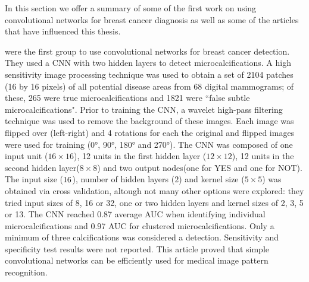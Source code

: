 In this section we offer a summary of some of the first work on using convolutional networks for breast cancer diagnosis as well as some of the articles that have influenced this thesis.

\cite{Lo1995} were the first group to use convolutional networks for breast cancer detection. They used a CNN with two hidden layers to detect microcalcifications. A high sensitivity image processing technique was used to obtain a set of 2104 patches (16 by 16 pixels) of all potential disease areas from 68 digital mammograms; of these, 265 were true microcalcifications and 1821 were ``false subtle microcalcifications". Prior to training the CNN, a wavelet high-pass filtering technique was used to remove the background of these images. Each image was flipped over (left-right) and 4 rotations for each the original and flipped images were used for training (0°, 90°, 180° and 270°). The CNN was composed of one input unit ($16\times16$), 12 units in the first hidden layer ($12\times12$), 12 units in the second hidden layer($8\times 8$) and two output nodes(one for YES and one for NOT). The input size ($16\time16$), number of hidden layers ($2$) and kernel size ($5\times5$) was obtained via cross validation, altough not many other options were explored: they tried input sizes of 8, 16 or 32, one or two hidden layers and kernel sizes of 2, 3, 5 or 13. The CNN reached 0.87 average AUC when identifying individual microcalcifications and 0.97 AUC for clustered microcalcifications. Only a minimum of three calcifications was considered a detection. Sensitivity and specificity test results were not reported. This article proved that simple convolutional networks can be efficiently used for medical image pattern recognition.







